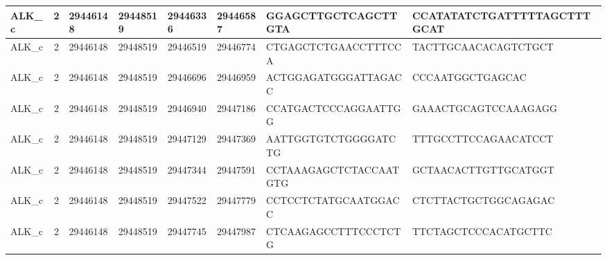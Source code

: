 \begin{landscape}
\begin{longtable}{| p{} | p{} | p{} | p{} | p{} | p{} | p{} | p{} |}
\multicolumn{1}{|l|}{ALK\_c}     & \multicolumn{1}{c|}{2}  & \multicolumn{1}{l|}{29446148}  & \multicolumn{1}{l|}{29448519}  & \multicolumn{1}{l|}{29446336}  & \multicolumn{1}{l|}{29446587}  & \multicolumn{1}{l|}{GGAGCTTGCTCAGCTTGTA}             & \multicolumn{1}{l|}{CCATATATCTGATTTTTAGCTTTGCAT}   \\ \hline
\multicolumn{1}{|l|}{ALK\_c}     & \multicolumn{1}{c|}{2}  & \multicolumn{1}{l|}{29446148}  & \multicolumn{1}{l|}{29448519}  & \multicolumn{1}{l|}{29446519}  & \multicolumn{1}{l|}{29446774}  & \multicolumn{1}{l|}{CTGAGCTCTGAACCTTTCCA}            & \multicolumn{1}{l|}{TACTTGCAACACAGTCTGCT}          \\ \hline
\multicolumn{1}{|l|}{ALK\_c}     & \multicolumn{1}{c|}{2}  & \multicolumn{1}{l|}{29446148}  & \multicolumn{1}{l|}{29448519}  & \multicolumn{1}{l|}{29446696}  & \multicolumn{1}{l|}{29446959}  & \multicolumn{1}{l|}{ACTGGAGATGGGATTAGACC}            & \multicolumn{1}{l|}{CCCAATGGCTGAGCAC}              \\ \hline
\multicolumn{1}{|l|}{ALK\_c}     & \multicolumn{1}{c|}{2}  & \multicolumn{1}{l|}{29446148}  & \multicolumn{1}{l|}{29448519}  & \multicolumn{1}{l|}{29446940}  & \multicolumn{1}{l|}{29447186}  & \multicolumn{1}{l|}{CCATGACTCCCAGGAATTGG}            & \multicolumn{1}{l|}{GAAACTGCAGTCCAAAGAGG}          \\ \hline
\multicolumn{1}{|l|}{ALK\_c}     & \multicolumn{1}{c|}{2}  & \multicolumn{1}{l|}{29446148}  & \multicolumn{1}{l|}{29448519}  & \multicolumn{1}{l|}{29447129}  & \multicolumn{1}{l|}{29447369}  & \multicolumn{1}{l|}{AATTGGTGTCTGGGGATCTG}            & \multicolumn{1}{l|}{TTTGCCTTCCAGAACATCCT}          \\ \hline
\multicolumn{1}{|l|}{ALK\_c}     & \multicolumn{1}{c|}{2}  & \multicolumn{1}{l|}{29446148}  & \multicolumn{1}{l|}{29448519}  & \multicolumn{1}{l|}{29447344}  & \multicolumn{1}{l|}{29447591}  & \multicolumn{1}{l|}{CCTAAAGAGCTCTACCAATGTG}          & \multicolumn{1}{l|}{GCTAACACTTGTTGCATGGT}          \\ \hline
\multicolumn{1}{|l|}{ALK\_c}     & \multicolumn{1}{c|}{2}  & \multicolumn{1}{l|}{29446148}  & \multicolumn{1}{l|}{29448519}  & \multicolumn{1}{l|}{29447522}  & \multicolumn{1}{l|}{29447779}  & \multicolumn{1}{l|}{CCTCCTCTATGCAATGGACC}            & \multicolumn{1}{l|}{CTCTTACTGCTGGCAGAGAC}          \\ \hline
\multicolumn{1}{|l|}{ALK\_c}     & \multicolumn{1}{c|}{2}  & \multicolumn{1}{l|}{29446148}  & \multicolumn{1}{l|}{29448519}  & \multicolumn{1}{l|}{29447745}  & \multicolumn{1}{l|}{29447987}  & \multicolumn{1}{l|}{CTCAAGAGCCTTTCCCTCTG}            & \multicolumn{1}{l|}{TTCTAGCTCCCACATGCTTC}          \\ \hline

\end{longtable}
\end{landscape}
